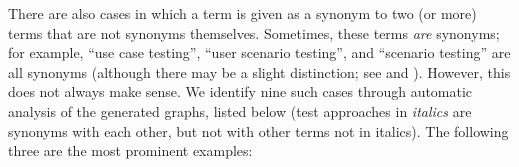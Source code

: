 \label{multiSyns}
There are also cases in which a term is given as a synonym to two (or more)
terms that are not synonyms themselves. Sometimes, these terms
\emph{are} synonyms; for example, \citetISTQB{} 
``use case testing'', ``user scenario testing'', and ``scenario testing'' are
all synonyms (although there may be a slight distinction; see
 and ).
%
%
%
%
However, this does not always make sense. We identify nine
such cases through automatic analysis of the generated graphs\ifnotpaper,
listed below (test approaches in \emph{italics} are synonyms with each other,
but not with other terms not in italics)\else. The following three are the most prominent examples\fi:

\ifnotpaper\else\fi

\begin{enumerate}
    
\end{enumerate}

